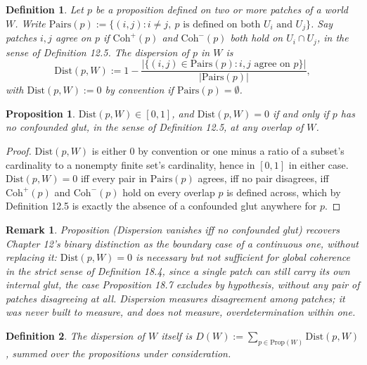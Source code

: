 \documentclass[11pt]{book}
\newtheorem*{appendixdefinition}{Definition}
\newtheorem*{appendixproposition}{Proposition}
\newtheorem*{appendixremark}{Remark}
\begin{document}
\begin{appendixdefinition}
Let $p$ be a proposition defined on two or more patches of a world $W$. Write $\mathrm{Pairs}(p) := \{(i,j) : i \neq j,\ p \text{ is defined on both } U_i \text{ and } U_j\}$. Say patches $i,j$ \emph{agree} on $p$ if $\mathrm{Coh}^+(p)$ and $\mathrm{Coh}^-(p)$ both hold on $U_i \cap U_j$, in the sense of Definition 12.5. The \emph{dispersion} of $p$ in $W$ is
\[
\mathrm{Dist}(p, W) := 1 - \frac{\big|\{(i,j) \in \mathrm{Pairs}(p) : i,j \text{ agree on } p\}\big|}{|\mathrm{Pairs}(p)|},
\]
with $\mathrm{Dist}(p,W) := 0$ by convention if $\mathrm{Pairs}(p) = \emptyset$.
\end{appendixdefinition}

\begin{appendixproposition}
$\mathrm{Dist}(p,W) \in [0,1]$, and $\mathrm{Dist}(p,W) = 0$ if and only if $p$ has no confounded glut, in the sense of Definition 12.5, at any overlap of $W$.
\end{appendixproposition}

\begin{proof}
$\mathrm{Dist}(p,W)$ is either $0$ by convention or one minus a ratio of a subset's cardinality to a nonempty finite set's cardinality, hence in $[0,1]$ in either case. $\mathrm{Dist}(p,W) = 0$ iff every pair in $\mathrm{Pairs}(p)$ agrees, iff no pair disagrees, iff $\mathrm{Coh}^+(p)$ and $\mathrm{Coh}^-(p)$ hold on every overlap $p$ is defined across, which by Definition 12.5 is exactly the absence of a confounded glut anywhere for $p$.
\end{proof}

\begin{appendixremark}
Proposition (Dispersion vanishes iff no confounded glut) recovers Chapter 12's binary distinction as the boundary case of a continuous one, without replacing it: $\mathrm{Dist}(p,W) = 0$ is necessary but not sufficient for global coherence in the strict sense of Definition 18.4, since a single patch can still carry its own internal glut, the case Proposition 18.7 excludes by hypothesis, without any pair of patches disagreeing at all. Dispersion measures disagreement \emph{among} patches; it was never built to measure, and does not measure, overdetermination \emph{within} one.
\end{appendixremark}

\begin{appendixdefinition}
The \emph{dispersion} of $W$ itself is $D(W) := \sum_{p \in \mathrm{Prop}(W)} \mathrm{Dist}(p,W)$, summed over the propositions under consideration.
\end{appendixdefinition}
\end{document}
